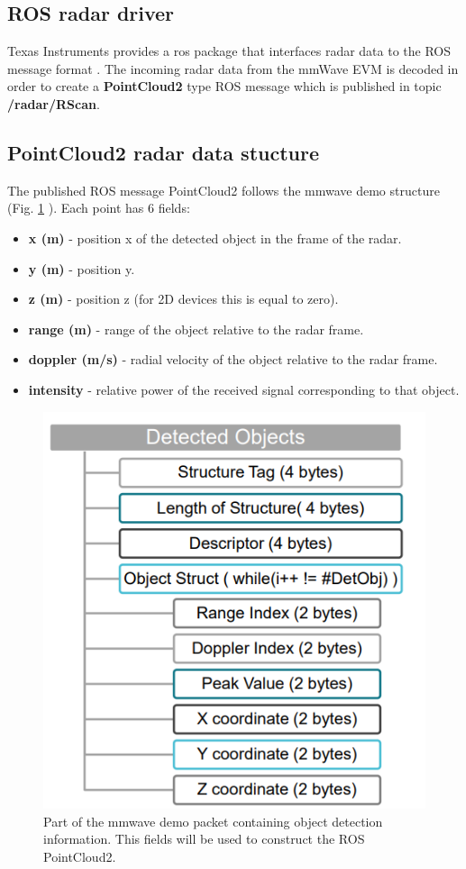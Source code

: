\documentclass[12pt]{article}
\begin{document}
\subsection{ROS radar driver}

Texas Instruments provides a ros package that interfaces radar data to the ROS message format \cite{tidriver}. The incoming radar data from the mmWave EVM is decoded in order to create a \textbf{PointCloud2} type ROS message which is published in topic \textbf{/radar/RScan}.

\subsection{PointCloud2 radar data stucture}

The published ROS message PointCloud2 follows the mmwave demo structure (Fig. \ref{fig:demodata} ). Each point has 6 fields:
\begin{itemize}
\item \textbf{x (m)} - position x of the detected  object in the frame of the radar.
\item \textbf{y (m)} - position y.
\item \textbf{z (m)} - position z (for 2D devices this is equal to zero).
\item \textbf{range (m)} - range of the object relative to the radar frame.
\item \textbf{doppler (m/s)} - radial velocity of the object relative to the radar frame.
\item \textbf{intensity} - relative power of the received signal corresponding to that object.
\end{itemize}

\begin{figure}[!htb]
    \centering
    \includegraphics[scale=0.8]{2_demo_vis_struct.PNG}
    \caption{Part of the mmwave demo packet containing object detection information. This fields will be used to construct the ROS PointCloud2\cite{demodata}.}
    \label{fig:demodata}
\end{figure}
\end{document}
